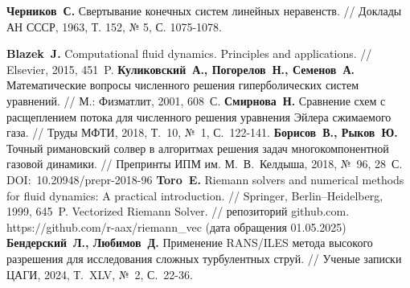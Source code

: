 \begin{thebibliography}{99}

% 
\textbf{Черников~С.} Свертывание конечных систем линейных неравенств. // Доклады АН СССР, 1963, Т. 152, № 5, С. 1075-1078.
%

%
\textbf{Blazek~J.} Computational fluid dynamics. Principles and applications. // Elsevier, 2015, 451~P.
%
\textbf{Куликовский~А., Погорелов~Н., Семенов~А.} Математические вопросы численного решения гиперболических систем уравнений. // М.: Физматлит, 2001, 608~С.
%
\textbf{Смирнова~Н.} Сравнение схем с расщеплением потока для численного решения уравнения Эйлера сжимаемого газа. // Труды МФТИ, 2018, Т.~10, №~1, С.~122-141.
%
\textbf{Борисов~В., Рыков~Ю.} Точный римановский солвер в алгоритмах решения задач многокомпонентной газовой динамики. // Препринты ИПМ им. М.~В.~Келдыша, 2018, №~96, 28~С. DOI:~10.20948/prepr-2018-96
%
\textbf{Toro~E.} Riemann solvers and numerical methods for fluid dynamics: A practical introduction. // Springer, Berlin–Heidelberg, 1999, 645~P.
%
Vectorized Riemann Solver. // репозиторий github.com. https://github.com/r-aax/riemann\_vec (дата обращения 01.05.2025)
%
\textbf{Бендерский~Л., Любимов~Д.} Применение RANS/ILES метода высокого разрешения для исследования сложных турбулентных струй. // Ученые записки ЦАГИ, 2024, Т.~XLV, №~2, С.~22-36. 
%




\end{thebibliography}
